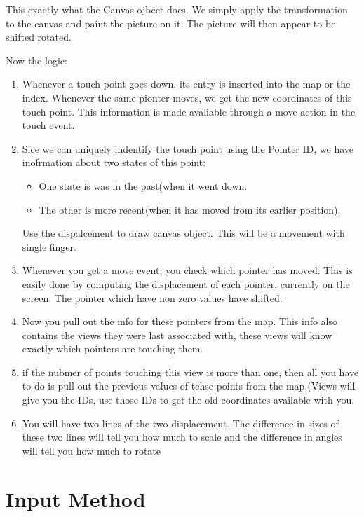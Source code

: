 \documentclass[11pt, a4paper]{book}
\begin{document}
This exactly what the Canvas ojbect does. We simply apply the transformation to
the canvas and paint the picture on it. The picture will then appear to be
shifted rotated. 

Now the logic:
\begin{enumerate}
\item Whenever a touch point goes down, its entry is inserted into the map or
the index. Whenever the same pionter moves, we get the new coordinates of this
touch point. This information is made avaliable through a move action in the
touch event.
\item Sice we can uniquely indentify the touch point using the Pointer ID, we
have inofrmation about two states of this point:
\begin{itemize}
\item One state is was in the past(when it went down.
\item The other is more recent(when it has moved from its earlier position).
\end{itemize}
Use the dispalcement to draw canvas object. This will be a movement with single
finger.
\item Whenever you get a move event, you check which pointer has moved. This is
easily done by computing the displacement of each pointer, currently on the
screen. The pointer which have non zero values have shifted. 
\item Now you pull out the info for these pointers from the map. This info also
 contains the views they were last associated with, these views will know
 exactly which pointers are touching them.
\item if the nubmer of points touching this view is more than one, then all you
have to do is pull out the previous values of tehse points from the map.(Views
will give you the IDs, use those IDs to get the old coordinates available with
you.
\item You will have two lines of the two displacement. The difference in sizes of
these two lines will tell you how much to scale and the difference in angles
will tell you how much to rotate
\end{enumerate}
\chapter{Input Method}
\end{document}
